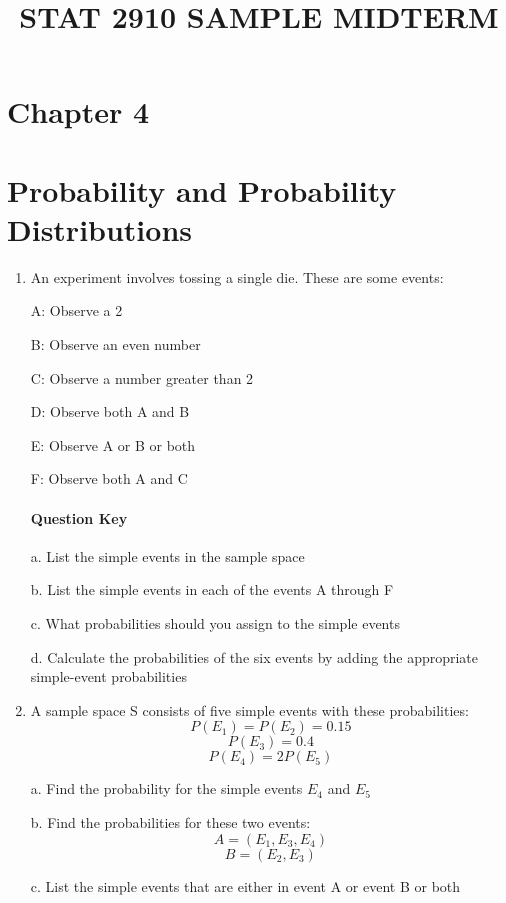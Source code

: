 \documentclass{article}
\title{STAT 2910 SAMPLE MIDTERM}
\begin{document}
\maketitle

\section*{Chapter 4}
\section*{Probability and Probability Distributions}

\begin{enumerate}
    \item An experiment involves tossing a single die. These are some events:
    
    A: Observe a 2

    B: Observe an even number

    C: Observe a number greater than 2

    D: Observe both A and B

    E: Observe A or B or both

    F: Observe both A and C
    
\paragraph*{Question Key} 

    
    
    \hfill \break a. List the simple events in the sample space

    b. List the simple events in each of the events A through F

    c. What probabilities should you assign to the simple events

    d. Calculate the probabilities of the six events by adding the appropriate simple-event probabilities
    
    \item A sample space S consists of five simple events with these probabilities:
    $$P(E_1) = P(E_2) = 0.15$$
    $$P(E_3) = 0.4$$
    $$P(E_4) = 2P(E_5)$$
    
     a. Find the probability for the simple events $E_4$ and $E_5$
    
     b. Find the probabilities for these two events:
        $$A = (E_1, E_3, E_4)$$
        $$B = (E_2, E_3)$$
   
    c. List the simple events that are either in event A or event B or both


\end{enumerate}
\end{document}
